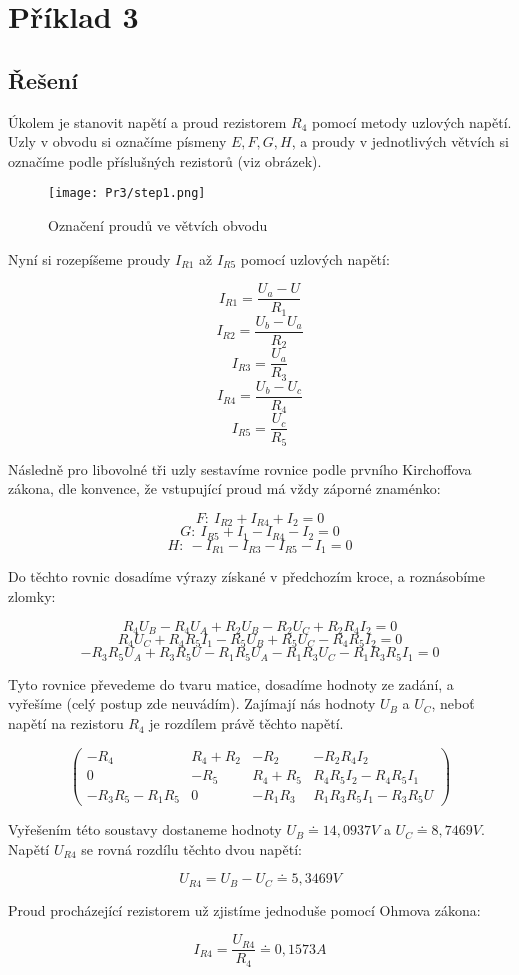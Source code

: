 \section{Příklad 3}

\subsection{Řešení}

Úkolem je stanovit napětí a proud rezistorem $R_4$ pomocí metody uzlových napětí. Uzly v obvodu si označíme písmeny $E, F, G, H$, a proudy v jednotlivých větvích si označíme podle příslušných rezistorů (viz obrázek).

\begin{figure}[H]
\texttt{[image: Pr3/step1.png]}
\centering
\caption{Označení proudů ve větvích obvodu}
\end{figure}

Nyní si rozepíšeme proudy $I_{R1}$ až $I_{R5}$ pomocí uzlových napětí:

$$ I_{R1} = \frac{U_a - U}{R_1} $$
$$ I_{R2} = \frac{U_b - U_a}{R_2} $$
$$ I_{R3} = \frac{U_a}{R_3} $$
$$ I_{R4} = \frac{U_b - U_c}{R_4} $$
$$ I_{R5} = \frac{U_c}{R_5} $$

Následně pro libovolné tři uzly sestavíme rovnice podle prvního Kirchoffova zákona, dle konvence, že vstupující proud má vždy záporné znaménko:

$$ F: \: I_{R2} + I_{R4} + I_2 = 0 $$
$$ G: \: I_{R5} + I_1 - I_{R4} - I_2 = 0 $$
$$ H: \: - I_{R1} - I_{R3} - I_{R5} - I_1 = 0 $$

Do těchto rovnic dosadíme výrazy získané v předchozím kroce, a roznásobíme zlomky:

$$ R_4U_B - R_4U_A + R_2U_B - R_2U_C + R_2R_4I_2 = 0 $$
$$ R_4U_C + R_4R_5I_1 - R_5U_B + R_5U_C - R_4R_5I_2 = 0 $$
$$ -R_3R_5U_A + R_3R_5U - R_1R_5U_A -R_1R_3U_C -R_1R_3R_5I_1 = 0 $$

Tyto rovnice převedeme do tvaru matice, dosadíme hodnoty ze zadání, a vyřešíme (celý postup zde neuvádím). Zajímají nás hodnoty $U_B$ a $U_C$, neboť napětí na rezistoru $R_4$ je rozdílem právě těchto napětí.

$$ \left (
\begin{array}{ccc|c}
	-R_4 & R_4 + R_2 & -R_2 & -R_2R_4I_2 \\
	0 & -R_5 & R_4 + R_5 & R_4R_5I_2 - R_4R_5I_1 \\
	-R_3R_5 - R_1R_5 & 0 & -R_1R_3 & R_1R_3R_5I_1 - R_3R_5U
\end{array}
\right) $$

Vyřešením této soustavy dostaneme hodnoty $U_B \doteq 14,0937 V$ a $U_C \doteq 8,7469 V$. Napětí $U_{R4}$ se rovná rozdílu těchto dvou napětí:

$$ U_{R4} = U_B - U_C \doteq 5,3469 V $$

Proud procházející rezistorem už zjistíme jednoduše pomocí Ohmova zákona:

$$ I_{R4} = \frac{U_{R4}}{R_4} \doteq 0,1573 A $$
